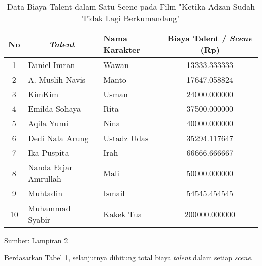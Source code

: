 {    \begin{table}
        \centering
        \caption{Data Biaya Talent dalam Satu Scene pada Film "Ketika Adzan Sudah Tidak Lagi Berkumandang"}
        \label{tab: data biaya talent}
        \begin{tabular}{|c|l|l|c|}
            \hline
            \textbf{No} & \multicolumn{1}{c|}{\textit{\textbf{Talent}}} & \textbf{Nama Karakter} & \textbf{Biaya Talent / \textit{Scene} (Rp)} \\ \hline
            1           & Daniel Imran                                  & Wawan                  & 13333.333333                                \\ \hline
            2           & A. Muslih Navis                               & Manto                  & 17647.058824                                \\ \hline
            3           & KimKim                                        & Usman                  & 24000.000000                                \\ \hline
            4           & Emilda Sohaya                                 & Rita                   & 37500.000000                                \\ \hline
            5           & Aqila Yumi                                    & Nina                   & 40000.000000                                \\ \hline
            6           & Dedi Nala Arung                               & Ustadz Udas            & 35294.117647                                \\ \hline
            7           & Ika Puspita                                   & Irah                   & 66666.666667                                \\ \hline
            8           & Nanda Fajar Amrullah                          & Mali                   & 50000.000000                                \\ \hline
            9           & Muhtadin                                      & Ismail                 & 54545.454545                                \\ \hline
            10          & Muhammad Syabir                               & Kakek Tua              & 200000.000000                               \\ \hline
        \end{tabular}
    \end{table}

    \vspace{-8mm}
    \begin{flushright}
        Sumber: Lampiran 2
    \end{flushright}

    Berdasarkan Tabel \ref{tab: data biaya talent}, selanjutnya dihitung total biaya \textit{talent} dalam setiap \textit{scene}.



}

\pagebreak